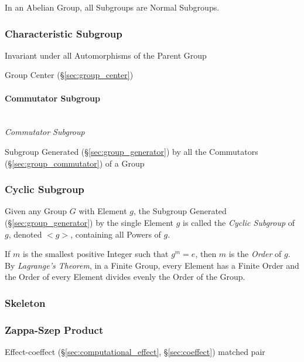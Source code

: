 In an Abelian Group, all Subgroups are Normal Subgroups.



\subsubsection{Characteristic Subgroup}
\label{sec:characteristic_subgroup}

Invariant under all Automorphisms of the Parent Group

Group Center (\S\ref{sec:group_center})



\paragraph{Commutator Subgroup}\label{sec:commutator_subgroup}
\hfill \\

\emph{Commutator Subgroup}

Subgroup Generated (\S\ref{sec:group_generator}) by all the
Commutators (\S\ref{sec:group_commutator}) of a Group



\subsubsection{Cyclic Subgroup}\label{sec:cyclic_subgroup}

Given any Group $G$ with Element $g$, the Subgroup Generated
(\S\ref{sec:group_generator}) by the single Element $g$ is called the
\emph{Cyclic Subgroup} of $g$, denoted $<g>$, containing all Powers of
$g$.

If $m$ is the smallest positive Integer such that $g^m = e$, then $m$
is the \emph{Order} of $g$. By \emph{Lagrange's Theorem}, in a Finite
Group, every Element has a Finite Order and the Order of every Element
divides evenly the Order of the Group.



\subsubsection{Skeleton}\label{sec:group_skeleton}

\subsubsection{Zappa-Szep Product}\label{sec:zappa_szep}

Effect-coeffect (\S\ref{sec:computational_effect},
\S\ref{sec:coeffect}) matched pair



